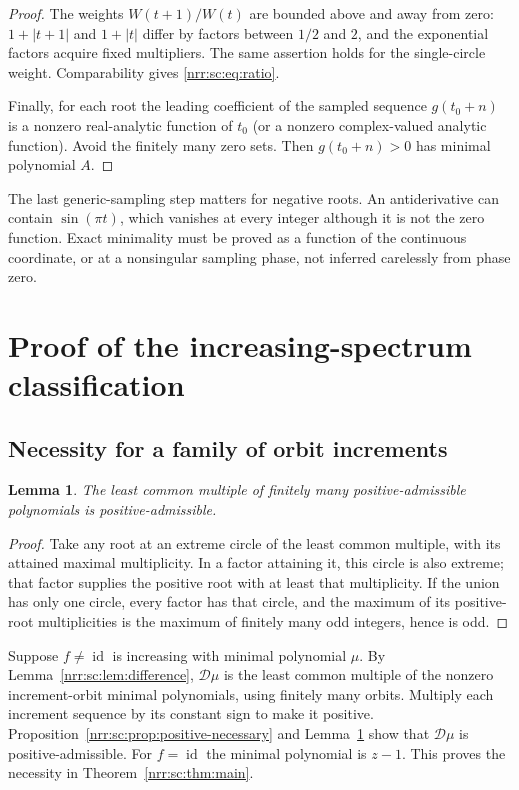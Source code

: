 \documentclass[11pt,letterpaper]{article}
\newtheorem{lemma}[theorem]{Lemma}
\theoremstyle{definition}
\theoremstyle{remark}
\newcommand{\id}{\operatorname{id}}
\newcommand{\scD}{\mathcal D}
\begin{document}
\begin{proof}
The weights $W(t+1)/W(t)$ are bounded above and away from zero:
$1+|t+1|$ and $1+|t|$ differ by factors between $1/2$ and $2$, and the
exponential factors acquire fixed multipliers. The same assertion holds
for the single-circle weight. Comparability gives \eqref{nrr:sc:eq:ratio}.

Finally, for each root the leading coefficient of the sampled sequence
$g(t_0+n)$ is a nonzero real-analytic function of $t_0$ (or a nonzero
complex-valued analytic function). Avoid the finitely many zero sets.
Then $g(t_0+n)>0$ has minimal polynomial $A$.
\end{proof}

The last generic-sampling step matters for negative roots. An
antiderivative can contain $\sin(\pi t)$, which vanishes at every integer
although it is not the zero function. Exact minimality must be proved
as a function of the continuous coordinate, or at a nonsingular sampling
phase, not inferred carelessly from phase zero.

\section{Proof of the increasing-spectrum classification}
\label{nrr:sc:sec:classification}

\subsection{Necessity for a family of orbit increments}

\begin{lemma}
\label{nrr:sc:lem:lcm-positive}
The least common multiple of finitely many positive-admissible
polynomials is positive-admissible.
\end{lemma}
\begin{proof}
Take any root at an extreme circle of the least common multiple, with
its attained maximal multiplicity. In a factor attaining it, this circle
is also extreme; that factor supplies the positive root with at least
that multiplicity. If the union has only one circle, every factor has
that circle, and the maximum of its positive-root multiplicities is the
maximum of finitely many odd integers, hence is odd.
\end{proof}

Suppose $f\ne\id$ is increasing with minimal polynomial $\mu$.
By Lemma~\ref{nrr:sc:lem:difference}, $\scD\mu$ is the least common multiple
of the nonzero increment-orbit minimal polynomials, using finitely many
orbits. Multiply each increment sequence by its constant sign to make
it positive. Proposition~\ref{nrr:sc:prop:positive-necessary} and
Lemma~\ref{nrr:sc:lem:lcm-positive} show that $\scD\mu$ is
positive-admissible. For $f=\id$ the minimal polynomial is $z-1$.
This proves the necessity in Theorem~\ref{nrr:sc:thm:main}.
\end{document}
